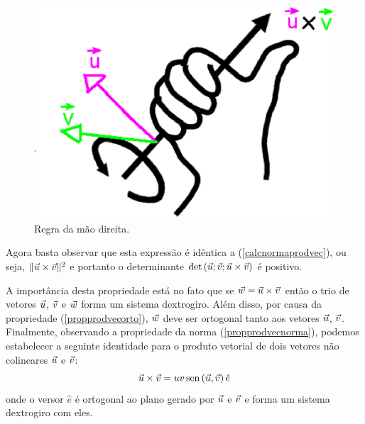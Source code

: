 \begin{figure}%
     \includegraphics[width=\textwidth]{./cap_algvet/pics/R_mao_dir.eps}
      \caption{Regra da mão direita. }
  \end{figure}


Agora basta observar que esta expressão é idêntica a (\ref{calcnormaprodvec}), ou seja, $\|\vec{u}\times\vec{v}\|^2$ e portanto o determinante $\det\left(\vec{u};\vec{v};\vec{u}\times\vec{v}\right)$ é positivo. 

A importância desta propriedade está no fato que se $\vec{w}=\vec{u}\times \vec{v}$ então o trio de vetores $\vec{u}$, $\vec{v}$ e $\vec{w}$ forma um sistema dextrogiro. Além disso, por causa da propriedade (\ref{propprodvecorto}), $\vec{w}$ deve ser ortogonal tanto aos vetores $\vec{u}$, $\vec{v}$. Finalmente, observando a propriedade da norma (\ref{propprodvecnorma}), podemos estabelecer a seguinte identidade para o produto vetorial de dois vetores não colineares $\vec{u}$ e $\vec{v}$:
\begin{equation}
\vec{u}\times\vec{v}=uv\operatorname{sen}\left(\vec{u},\vec{v}\right)\hat{e}
\end{equation}
onde o versor $\hat{e}$ é ortogonal ao plano gerado por $\vec{u}$ e $\vec{v}$ e forma um sistema dextrogiro com eles.  

